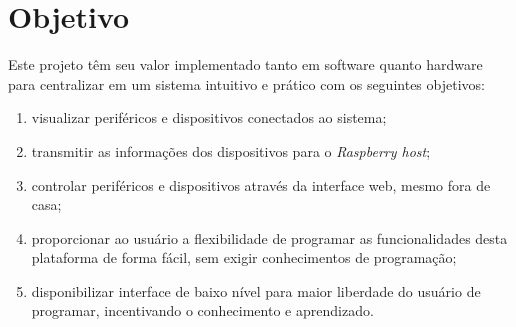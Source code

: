 \documentclass[../../layout.tex]{subfiles}
\begin{document}
\section{Objetivo}
\hspace*{3em}Este projeto têm seu valor implementado tanto em software quanto hardware para centralizar em um sistema intuitivo e prático com os seguintes objetivos:
\begin{enumerate}[label=\alph*)]
\itemsep0em
\item visualizar periféricos e dispositivos conectados ao sistema;
\item transmitir as informações dos dispositivos para o \emph{Raspberry host};
\item controlar periféricos e dispositivos através da interface web, mesmo fora de casa;
\item proporcionar ao usuário a flexibilidade de programar as funcionalidades desta plataforma de forma fácil, sem exigir conhecimentos de programação;
\item disponibilizar interface de baixo nível para maior liberdade do usuário de programar, incentivando o conhecimento e aprendizado.
\end{enumerate}
\end{document}
